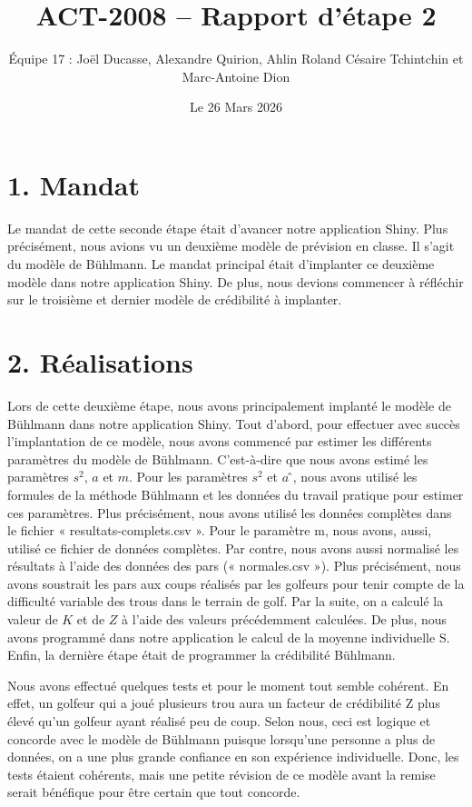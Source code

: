 \documentclass[
  11pt,
]{article}
\title{ACT-2008 -- Rapport d'étape 2}
\author{Équipe 17 : Joël Ducasse, Alexandre Quirion, Ahlin Roland
Césaire Tchintchin et Marc-Antoine Dion}
\date{Le 26 Mars 2026}
\begin{document}
\maketitle

\section*{1. Mandat}

Le mandat de cette seconde étape était d'avancer notre application
Shiny. Plus précisément, nous avions vu un deuxième modèle de prévision
en classe. Il s'agit du modèle de Bühlmann. Le mandat principal était
d'implanter ce deuxième modèle dans notre application Shiny. De plus,
nous devions commencer à réfléchir sur le troisième et dernier modèle de
crédibilité à implanter.

\section*{2. Réalisations}

Lors de cette deuxième étape, nous avons principalement implanté le
modèle de Bühlmann dans notre application Shiny. Tout d'abord, pour
effectuer avec succès l'implantation de ce modèle, nous avons commencé
par estimer les différents paramètres du modèle de Bühlmann.
C'est-à-dire que nous avons estimé les paramètres \(s^2\), \(a\) et
\(m\). Pour les paramètres \(s^2\) et \(a\) ̂, nous avons utilisé les
formules de la méthode Bühlmann et les données du travail pratique pour
estimer ces paramètres. Plus précisément, nous avons utilisé les données
complètes dans le fichier « resultats-complets.csv ». Pour le paramètre
m, nous avons, aussi, utilisé ce fichier de données complètes. Par
contre, nous avons aussi normalisé les résultats à l'aide des données
des pars (« normales.csv »). Plus précisément, nous avons soustrait les
pars aux coups réalisés par les golfeurs pour tenir compte de la
difficulté variable des trous dans le terrain de golf. Par la suite, on
a calculé la valeur de \(K\) et de \(Z\) à l'aide des valeurs
précédemment calculées. De plus, nous avons programmé dans notre
application le calcul de la moyenne individuelle S. Enfin, la dernière
étape était de programmer la crédibilité Bühlmann.

Nous avons effectué quelques tests et pour le moment tout semble
cohérent. En effet, un golfeur qui a joué plusieurs trou aura un facteur
de crédibilité Z plus élevé qu'un golfeur ayant réalisé peu de coup.
Selon nous, ceci est logique et concorde avec le modèle de Bühlmann
puisque lorsqu'une personne a plus de données, on a une plus grande
confiance en son expérience individuelle. Donc, les tests étaient
cohérents, mais une petite révision de ce modèle avant la remise serait
bénéfique pour être certain que tout concorde.
\end{document}
